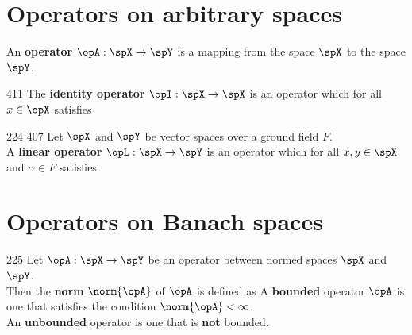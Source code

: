 
\label{app:linearop}


\section{Operators on arbitrary spaces}
\begin{definition}
An {\bf operator} $\opA:\spX\to\spY$ is a mapping from
the space $\spX$ to the space $\spY$.
\end{definition}

\begin{definition}
\citep{michel}{411}
The {\bf identity operator} $\opI:\spX\to\spX$ is an operator which 
for all $x\in\opX$ satisfies
\end{definition}

\begin{definition}
\citep{ab}{224}
\citep{michel}{407}
Let $\spX$ and $\spY$ be vector spaces over a ground field $F$.\\
A {\bf linear operator} $\opL:\spX\to\spY$ is an operator which 
for all $x,y\in\spX$ and $\alpha\in F$ satisfies
\end{definition}

\section{Operators on Banach spaces}
\begin{definition}
\citep{ab}{225}
Let $\opA:\spX\to\spY$ be an operator between normed spaces  
$\spX$ and $\spY$. \\
Then the {\bf norm} $\norm{\opA}$ of $\opA$ is defined as
A {\bf bounded} operator $\opA$ is one that satisfies the condition 
$\norm{\opA}<\infty$. \\
An {\bf unbounded} operator is one that is {\bf not} bounded.
\end{definition}


